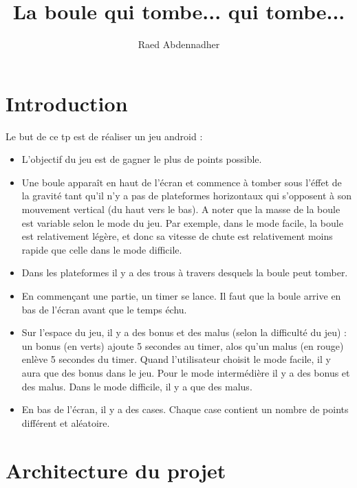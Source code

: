 \documentclass[a4paper, 11pt]{article}
\begin{document}
\title{La boule qui tombe... qui tombe...} 
\author{Raed Abdennadher} 
\maketitle

\section{Introduction}
Le but de ce tp est de réaliser un jeu android :
\begin{itemize}
	\item L'objectif du jeu est de gagner le plus de points possible.
	\item Une boule apparaît en haut de l’écran et commence à tomber sous l'éffet de la gravité tant qu'il n'y a pas
	de plateformes horizontaux qui s'opposent à son mouvement vertical (du haut vers le bas). A noter que la masse
	de la boule est variable selon le mode du jeu. Par exemple, dans le mode facile, la boule est relativement
	légère, et donc sa vitesse de chute est relativement moins rapide que celle dans le mode difficile.
	\item Dans les plateformes il y a des trous à travers desquels la boule peut tomber.
	\item En commençant une partie, un timer se lance. Il faut que la boule arrive en bas de l'écran avant que
	le temps échu.
	\item Sur l'espace du jeu, il y a des bonus et des malus (selon la difficulté du jeu) : un bonus (en verts)
	ajoute 5 secondes au timer, alos qu'un malus (en rouge) enlève 5 secondes du timer. Quand l'utilisateur choisit
	le mode facile, il y aura que des bonus dans le jeu. Pour le mode intermédière il y a des bonus et des malus.
	Dans le mode difficile, il y a que des malus.
	\item En bas de l'écran, il y a des cases. Chaque case contient un nombre de points différent et aléatoire.
\end{itemize}

\section{Architecture du projet}
\end{document}
